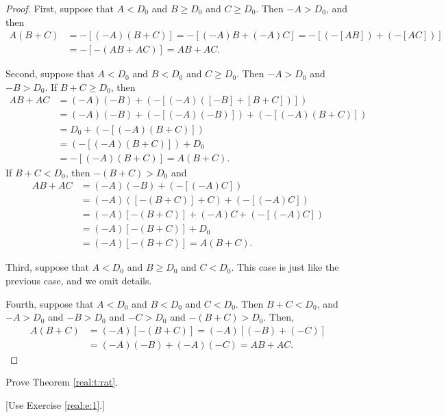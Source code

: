 \begin{proof}
	First, suppose that $A < D_0$ and $B \geq D_0$ and $C \geq D_0$. Then $-A > D_0$, and then
	\begin{align*}
		A(B + C) & = -[(-A)(B + C)] = -[(-A)B + (-A)C] = -[(-[A B]) + (-[A C])] \\
		         & = -[-(A B + A C)] = A B + A C.
	\end{align*}

	Second, suppose that $A < D_0$ and $B < D_0$ and $C \geq D_0$. Then $-A > D_0$ and $-B > D_0$. If $B + C \geq D_0$, then
	\begin{align*}
		A B + A C & = (-A)(-B) + (-[(-A)([-B] + [B + C])])        \\
		          & = (-A)(-B) + (-[(-A)(-B)]) + (-[(-A)(B + C)]) \\
		          & = D_0 + (-[(-A)(B + C)])                      \\
		          & = (-[(-A)(B + C)]) + D_0                      \\
		          & = -[(-A)(B + C)] = A(B + C).
	\end{align*}
	If $B + C < D_0$, then $-(B + C) > D_0$ and
	\begin{align*}
		A B + A C & = (-A)(-B) + (-[(-A)C])               \\
		          & = (-A)([-(B + C)] + C) + (-[(-A)C])   \\
		          & = (-A)[-(B + C)] + (-A)C + (-[(-A)C]) \\
		          & = (-A)[-(B + C)] + D_0                \\
		          & = (-A)[-(B + C)] = A(B + C).
	\end{align*}

	Third, suppose that $A < D_0$ and $B \geq D_0$ and $C < D_0$. This case is just like the previous case, and we omit details.

	Fourth, suppose that $A < D_0$ and $B < D_0$ and $C < D_0$. Then $B + C < D_0$, and $-A > D_0$ and $-B > D_0$ and $-C > D_0$ and $-(B + C) > D_0$. Then,
	\begin{align*}
		A(B + C) & = (-A)[-(B + C)] = (-A)[(-B) + (-C)] \\
		         & = (-A)(-B) + (-A)(-C) = A B + A C.
	\end{align*}
\end{proof}


\Newpage
\begin{exercise} %
	\label{real:e:7}
	Prove Theorem \ref{real:t:rat}.

	\hfill [Use Exercise \ref{real:e:1}.]
\end{exercise}

